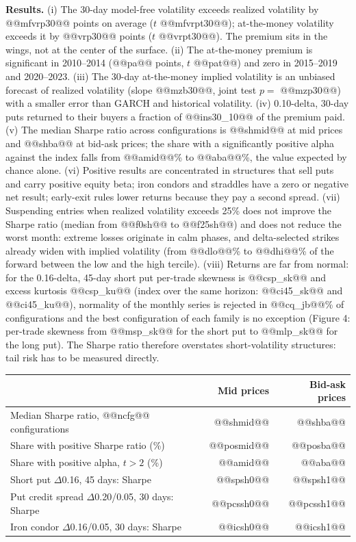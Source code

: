 \documentclass[11pt,a4paper]{article}
\begin{document}
\textbf{Results.} (i) The 30-day model-free volatility exceeds realized volatility by @@mfvrp30@@ points on average ($t$ @@mfvrpt30@@); at-the-money volatility exceeds it by @@vrp30@@ points ($t$ @@vrpt30@@). The premium sits in the wings, not at the center of the surface. (ii) The at-the-money premium is significant in 2010--2014 (@@pa@@ points, $t$ @@pat@@) and zero in 2015--2019 and 2020--2023. (iii) The 30-day at-the-money implied volatility is an unbiased forecast of realized volatility (slope @@mzb30@@, joint test $p=$ @@mzp30@@) with a smaller error than GARCH and historical volatility. (iv) 0.10-delta, 30-day puts returned to their buyers a fraction of @@ins30_10@@ of the premium paid. (v) The median Sharpe ratio across configurations is @@shmid@@ at mid prices and @@shba@@ at bid-ask prices; the share with a significantly positive alpha against the index falls from @@amid@@\% to @@aba@@\%, the value expected by chance alone. (vi) Positive results are concentrated in structures that sell puts and carry positive equity beta; iron condors and straddles have a zero or negative net result; early-exit rules lower returns because they pay a second spread. (vii) Suspending entries when realized volatility exceeds 25\% does not improve the Sharpe ratio (median from @@f0sh@@ to @@f25sh@@) and does not reduce the worst month: extreme losses originate in calm phases, and delta-selected strikes already widen with implied volatility (from @@dlo@@\% to @@dhi@@\% of the forward between the low and the high tercile). (viii) Returns are far from normal: for the 0.16-delta, 45-day short put per-trade skewness is @@csp_sk@@ and excess kurtosis @@csp_ku@@ (index over the same horizon: @@ci45_sk@@ and @@ci45_ku@@), normality of the monthly series is rejected in @@cq_jb@@\% of configurations and the best configuration of each family is no exception (Figure 4: per-trade skewness from @@msp_sk@@ for the short put to @@mlp_sk@@ for the long put). The Sharpe ratio therefore overstates short-volatility structures: tail risk has to be measured directly.

\begin{center}\small
\begin{tabular}{lrr}\toprule
 & Mid prices & Bid-ask prices \\ \midrule
Median Sharpe ratio, @@ncfg@@ configurations & @@shmid@@ & @@shba@@ \\
Share with positive Sharpe ratio (\%) & @@posmid@@ & @@posba@@ \\
Share with positive alpha, $t>2$ (\%) & @@amid@@ & @@aba@@ \\
Short put $\Delta$0.16, 45 days: Sharpe & @@spsh0@@ & @@spsh1@@ \\
Put credit spread $\Delta$0.20/0.05, 30 days: Sharpe & @@pcssh0@@ & @@pcssh1@@ \\
Iron condor $\Delta$0.16/0.05, 30 days: Sharpe & @@icsh0@@ & @@icsh1@@ \\
\bottomrule\end{tabular}
\end{center}
\end{document}
